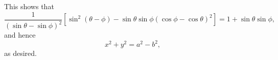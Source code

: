 \begin{enumerate}
          This shows that
          \[
              \frac{1}{(\sin \theta - \sin \phi)^2} \left[\sin^2 (\theta - \phi) - \sin \theta \sin \phi \left(\cos \phi - \cos \theta\right)^2\right] = 1 + \sin \theta \sin \phi,
          \]
          and hence
          \[
              x^2 + y^2 = a^2 - b^2,
          \]
          as desired.

\end{enumerate}